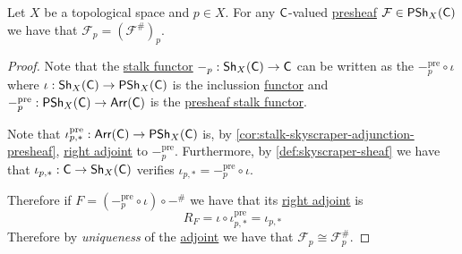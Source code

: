 \documentclass[../../../main]{subfiles}
\begin{document}
\begin{proposition}
  Let \(X\) be a topological space and \(p \in X\).
  For any \(\mathsf{C}\)-valued \hyperref[def:presheaf]{presheaf} \(\mathcal{F} \in \mathsf{PSh}_{X}(\mathsf{C})\) we have that \(\mathcal{F}_{p} = (\mathcal{F}^{\#})_{p}\).
\end{proposition}
\begin{proof}
  Note that the \hyperref[def:stalk-sheaf]{stalk functor} \(-_{p}: \mathsf{Sh}_{X}(\mathsf{C}) \to \mathsf{C}\) can be written as the \(-_{p}^{\operatorname{pre}} \circ \iota\) where \(\iota: \mathsf{Sh}_{X}(\mathsf{C}) \to \mathsf{PSh}_{X}(\mathsf{C})\) is the inclussion \hyperref[def:functor]{functor} and \(-_{p}^{\operatorname{pre}}: \mathsf{PSh}_{X}(\mathsf{C}) \to \mathsf{Arr}(\mathsf{C})\) is the \hyperref[ex:stalk-presheaf]{presheaf stalk functor}.

  Note that \(\iota_{p, \ast}^{\operatorname{pre}}: \mathsf{Arr}(\mathsf{C}) \to \mathsf{PSh}_{X}(\mathsf{C})\) is, by \autoref{cor:stalk-skyscraper-adjunction-presheaf}, \hyperref[def:adjoint-functors]{right adjoint} to \(-_{p}^{\operatorname{pre}}\).
  Furthermore, by \autoref{def:skyscraper-sheaf} we have that \(\iota_{p, \ast}: \mathsf{C} \to \mathsf{Sh}_{X}(\mathsf{C})\) verifies \(\iota_{p, \ast} = -_{p}^{\operatorname{pre}} \circ \iota\).

  Therefore if \(F = (-_{p}^{\operatorname{pre}} \circ \iota) \circ -^{\#}\) we have that its \hyperref[def:adjoint-functors]{right adjoint} is
  \begin{equation*}
    R_{F} = \iota \circ \iota_{p, \ast}^{\operatorname{pre}} = \iota_{p, \ast}
  \end{equation*}
  Therefore by \textit{uniqueness} of the \hyperref[def:adjoint-functors]{adjoint} we have that \(\mathcal{F}_{p} \cong \mathcal{F}_{p}^{\#}\).
\end{proof}
\end{document}
